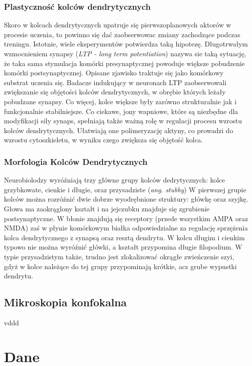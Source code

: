 \documentclass{article}
\begin{document}
\subsubsection{Plastyczność kolców dendrytycznych}
Skoro w kolcach dendrytycznych upatruje się pierwszoplanowych aktorów w procesie uczenia, to powinno się dać zaobserwowac zmiany zachodzące podczas treningu.
Istotnie, wiele eksperymentów potwierdza taką hipotezę.
Długotrwałym wzmocnieniem synapsy (\emph{LTP - long term potentiation}) nazywa sie taką sytuację, że taka sama stymulacja komórki presynaptycznej powoduje większe pobudzenie komórki postsynaptycznej.
Opisane zjawisko traktuje się jako komórkowy substrat uczenia się.
Badacze indukujący w neuronach LTP zaobserwowali zwiększanie się objętości kolców dendrytycznych, w obrębie których leżały pobudzane synapsy.
Co więcej, kolce większe były zarówno strukturalnie jak i funkcjonalnie stabilniejsze.
Co ciekawe, jony wapniowe, które są niezbędne dla modyfikacji siły synaps, spełniają także ważną rolę w regulacji procesu wzrostu kolców dendrytycznych.
Ułatwiają one polimeryzację aktyny, co prowadzi do wzrostu cytoszkieletu, w wyniku czego zwiększa się objętość kolca. 

\subsubsection{Morfologia Kolców Dendrytycznych}
Neurobiolodzy wyróźniają trzy główne grupy kolców dedrytycznych: kolce grzybkowate, cienkie i długie, oraz przysadziste (\emph{ang. stubby})
W pierwszej grupie kolców można rozróźnić dwie dobrze wyodrębnione struktury: główkę oraz szyjkę.
Głowa ma zaokrąglony kształt i na jejczubku znajduje się zgrubienie postsynaptyczne.
W błonie znajdują się receptory (przede wszystkim AMPA oraz NMDA) zaś w płynie komórkowym białka odpowiedzialne za regulację sprzężenia kolca dendrytycznego z synapsą oraz resztą dendrytu. %
W kolcu długim i cienkim typowo nie można wyróźnić główki, a kształt przypomina długie filopodium.
W typie przysadzistym także, trudno jest zlokalizować okrągłe zwieńczenie szyi, gdyż w kolce należące do tej grupy przypominają krótkie, acz grube wypustki dendrytu. %
\cite{Sala2014}
\cite{Costa2007}

\subsection{Mikroskopia konfokalna}
vddd

\section{Dane}
\end{document}
